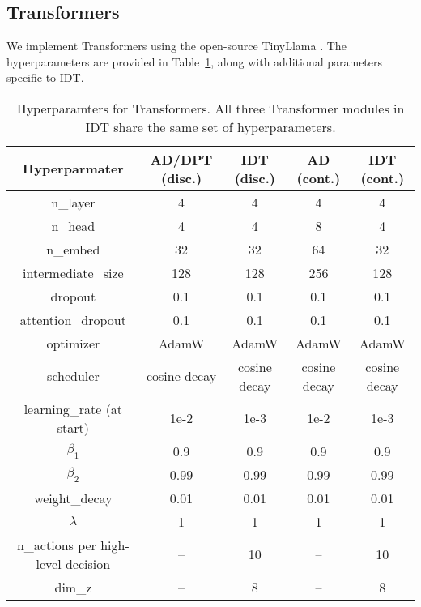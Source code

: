 \documentclass{article}
\begin{document}
\subsection{Transformers}
We implement Transformers using the open-source TinyLlama \citep{TinyLlama}.
The hyperparameters are provided in Table~\ref{tab:hyp-tf}, along with additional parameters specific to IDT.

\begin{table}[h]
    \caption{Hyperparamters for Transformers.
    All three Transformer modules in IDT share the same set of hyperparameters.
    }
    \label{tab:hyp-tf}
    \small \centering
    \begin{tabular}{ccccc}
    \toprule
    Hyperparmater & AD/DPT (disc.) & IDT (disc.) & AD (cont.) & IDT (cont.)\\
    \midrule
    n\_layer & 4 & 4 & 4 & 4\\
    n\_head & 4 & 4 & 8 & 4\\
    n\_embed & 32 & 32 & 64 & 32\\
    intermediate\_size & 128 & 128 & 256 & 128\\
    dropout & 0.1 & 0.1 & 0.1 & 0.1\\
    attention\_dropout & 0.1 & 0.1 & 0.1 & 0.1\\
    optimizer & AdamW & AdamW & AdamW & AdamW\\
    scheduler & cosine decay & cosine decay & cosine decay & cosine decay\\
    learning\_rate (at start) & 1e-2 & 1e-3 & 1e-2 & 1e-3\\
    $\beta_1$ & 0.9 & 0.9 & 0.9 & 0.9\\
    $\beta_2$ & 0.99 & 0.99 & 0.99 & 0.99\\
    weight\_decay & 0.01 & 0.01 & 0.01 & 0.01\\
    $\lambda$ & 1 & 1 & 1 & 1\\
    \midrule
    n\_actions per high-level decision & -- & 10 & -- & 10 \\
    dim\_z & -- & 8 & -- &8\\
    \bottomrule
    \end{tabular}
\end{table}
\end{document}
